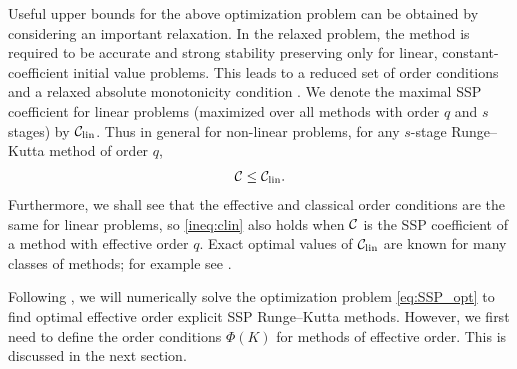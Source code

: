Useful upper bounds for the above optimization problem can be obtained 
by considering an important relaxation. 
In the relaxed problem, the method is required to be accurate and strong 
stability preserving only for linear, constant-coefficient initial value problems. 
This leads to a reduced set of order conditions and a relaxed absolute 
monotonicity condition \cite{Kraaijevanger1986,Ketcheson2008,ketcheson2009a}.
We denote the maximal SSP coefficient for linear problems
(maximized over all methods with order $q$ and $s$ stages) by $\mathcal{C}_{\text{lin}}$.
Thus in general for non-linear problems, for any $s$-stage Runge--Kutta
method of order $q$,
\begin{align} \label{ineq:clin}
	\mathcal{C}\le\mathcal{C}_{\text{lin}}.
\end{align}
Furthermore, we shall see that the effective and classical order conditions are the same for
linear problems, so \eqref{ineq:clin} also holds when $\mathcal{C}$ is the SSP coefficient
of a method with effective order $q$.
Exact optimal values of $\mathcal{C}_{\text{lin}}$ are known for many classes of methods; for
example see \cite{Kraaijevanger1986,Ketcheson2008,ketcheson2009a}.

Following \cite{Ketcheson2008, Ketcheson/Macdonald/Gottlieb:2009}, 
we will numerically solve the optimization problem \eqref{eq:SSP_opt} to find
optimal effective order explicit SSP Runge--Kutta methods.
However, we first need to define the order conditions $\Phi(K)$ for methods
of effective order.
This is discussed in the next section.
